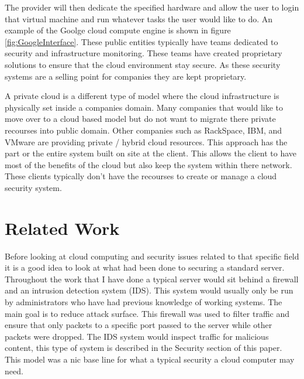\documentclass[12pt]{article}
\begin{document}
The provider will then dedicate the specified hardware and allow the user to login that virtual machine and run whatever tasks the user would like to do. An example of the Goolge cloud compute engine is shown in figure \ref{fig:GoogleInterface}.  These public entities typically have teams dedicated to security and infrastructure monitoring. These teams have created proprietary solutions to ensure that the cloud environment \cite{SecAmazon} stay secure. As these security systems are a selling point for companies they are kept proprietary. 

A private cloud is a different type of model where the cloud infrastructure is physically set inside a companies domain. Many companies that would like to move over to a cloud based model but do not want to migrate there private recourses into public domain. Other companies such as RackSpace, IBM, and VMware are providing private / hybrid cloud resources. This approach has the part or the entire system built on site at the client. This allows the client to have most of the benefits of the cloud but also keep the system within there network. These clients typically don't have the recourses to create or manage a cloud security system. 

\section{Related Work}
Before looking at cloud computing and security issues related to that specific field it is a good idea to look at what had been done to securing a standard server. Throughout the work that I have done a typical server would sit behind a firewall and an intrusion detection system (IDS).  This system would usually only be run by administrators who have had previous knowledge of working systems. The main goal is to reduce attack surface. This firewall was used to filter traffic and ensure that only packets to a specific port passed to the server while other packets were dropped. The IDS system would inspect traffic for malicious content, this type of system is described in the Security section of this paper. This model was a nic base line for what a typical security a cloud computer may need. 
\end{document}
